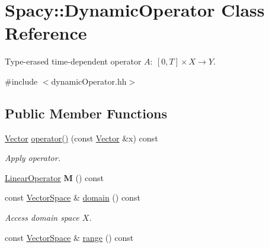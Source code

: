 \hypertarget{classSpacy_1_1DynamicOperator}{\section{Spacy\-:\-:Dynamic\-Operator Class Reference}
\label{classSpacy_1_1DynamicOperator}
}


Type-\/erased time-\/dependent operator $A:\ [0,T] \times X \to Y $.  




{\ttfamily \#include $<$dynamic\-Operator.\-hh$>$}

\subsection*{Public Member Functions}
\begin{DoxyCompactItemize}
\item 
\hypertarget{classSpacy_1_1DynamicOperator_ace2c2202ca6eb3fe5f5817087d30510a}{\hyperlink{classSpacy_1_1Vector}{Vector} \hyperlink{classSpacy_1_1DynamicOperator_ace2c2202ca6eb3fe5f5817087d30510a}{operator()} (const \hyperlink{classSpacy_1_1Vector}{Vector} \&x) const }\label{classSpacy_1_1DynamicOperator_ace2c2202ca6eb3fe5f5817087d30510a}

\begin{DoxyCompactList}\small\item\em Apply operator. \end{DoxyCompactList}\item 
\hypertarget{classSpacy_1_1DynamicOperator_a38c8c5337fd79a98a7e64139d0cbed38}{\hyperlink{classSpacy_1_1LinearOperator}{Linear\-Operator} {\bfseries M} () const }\label{classSpacy_1_1DynamicOperator_a38c8c5337fd79a98a7e64139d0cbed38}

\item 
\hypertarget{classSpacy_1_1DynamicOperator_ad457cb5571c721f97530895aa26af626}{const \hyperlink{classSpacy_1_1VectorSpace}{Vector\-Space} \& \hyperlink{classSpacy_1_1DynamicOperator_ad457cb5571c721f97530895aa26af626}{domain} () const }\label{classSpacy_1_1DynamicOperator_ad457cb5571c721f97530895aa26af626}

\begin{DoxyCompactList}\small\item\em Access domain space $X$. \end{DoxyCompactList}\item 
\hypertarget{classSpacy_1_1DynamicOperator_ab760994d921fa8d9df2882f9e4cfc9c3}{const \hyperlink{classSpacy_1_1VectorSpace}{Vector\-Space} \& \hyperlink{classSpacy_1_1DynamicOperator_ab760994d921fa8d9df2882f9e4cfc9c3}{range} () const }\label{classSpacy_1_1DynamicOperator_ab760994d921fa8d9df2882f9e4cfc9c3}


\end{DoxyCompactItemize}
